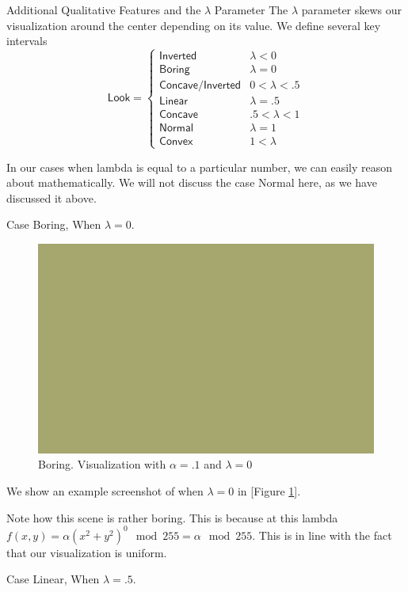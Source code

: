 \documentclass[11pt]{article}
\newcommand{\reffig}[1]{[Figure \ref{#1}]}
\begin{document}
\clearpage
\begin{section}{Additional Qualitative Features and the $\lambda$ Parameter}
The $\lambda$ parameter skews our visualization around the center depending on its value. We define several key intervals
\[\textsf{Look} = \begin{cases}
\textsf{Inverted} & \lambda < 0\\
\textsf{Boring} & \lambda = 0\\
\textsf{Concave/Inverted} & 0 < \lambda < .5\\
\textsf{Linear} & \lambda = .5\\
\textsf{Concave} & .5 < \lambda < 1\\
\textsf{Normal} & \lambda = 1\\
\textsf{Convex} & 1 < \lambda
\end{cases}\]

In our cases when lambda is equal to a particular number, we can easily reason about mathematically. We will not discuss the case \textsf{Normal} here, as we have discussed it above.
\begin{subsection}{Case {\normalfont\textsf{Boring}}, When $\lambda = 0$.}
\begin{figure}[h]
\centering
\includegraphics[width=.9\textwidth]{boring.png}
\caption{Boring. Visualization with $\alpha = .1$ and $\lambda = 0$}
\label{fig:boring}
\end{figure}
We show an example screenshot of when $\lambda = 0$ in \reffig{fig:boring}. 

Note how this scene is rather boring. This is because at this lambda $f(x, y) = \alpha(x^2 + y^2)^0 \mod 255 = \alpha \mod 255$. This is in line with the fact that our visualization is uniform. 
\end{subsection}
\begin{subsection}{Case {\normalfont\textsf{Linear}}, When $\lambda = .5$.}


\end{subsection}
\end{section}
\end{document}
